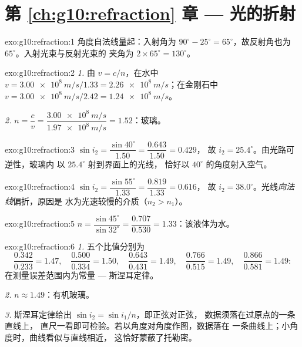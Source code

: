 \section*{第 \ref{ch:g10:refraction} 章 --- 光的折射}

\begin{solution}{exo:g10:refraction:1}
角度自法线量起：入射角为
$90^\circ - 25^\circ = 65^\circ$，故反射角也为
$65^\circ$。入射光束与反射光束的
夹角为 $2 \times 65^\circ = 130^\circ$。
\end{solution}

\begin{solution}{exo:g10:refraction:2}
\emph{1.} 由 $v = c/n$，在水中
$v = \qty{3.00e8}{m/s}/1.33 = \qty{2.26e8}{m/s}$；在金刚石中
$v = \qty{3.00e8}{m/s}/2.42 = \qty{1.24e8}{m/s}$。

\emph{2.} $n = \dfrac{c}{v} = \dfrac{\qty{3.00e8}{m/s}}
{\qty{1.97e8}{m/s}} = 1.52$：玻璃。
\end{solution}

\begin{solution}{exo:g10:refraction:3}
$\sin i_2 = \dfrac{\sin 40^\circ}{1.50} = \dfrac{0.643}{1.50} = 0.429$，
故 $i_2 = 25.4^\circ$。由光路可逆性，玻璃内
以 $25.4^\circ$ 射到界面上的光线，
恰好以 $40^\circ$ 的角度射入空气。
\end{solution}

\begin{solution}{exo:g10:refraction:4}
$\sin i_2 = \dfrac{\sin 55^\circ}{1.33} = \dfrac{0.819}{1.33} = 0.616$，
故 $i_2 = 38.0^\circ$。光线\emph{向法线}偏折，原因是
水为光速较慢的介质（$n_2 > n_1$）。
\end{solution}

\begin{solution}{exo:g10:refraction:5}
$n = \dfrac{\sin 45^\circ}{\sin 32^\circ} = \dfrac{0.707}{0.530}
= 1.33$：该液体为水。
\end{solution}

\begin{solution}{exo:g10:refraction:6}
\emph{1.} 五个比值分别为
\[
\frac{0.342}{0.233} = 1.47,\quad
\frac{0.500}{0.334} = 1.50,\quad
\frac{0.643}{0.431} = 1.49,\quad
\frac{0.766}{0.515} = 1.49,\quad
\frac{0.866}{0.581} = 1.49 :
\]
在测量误差范围内为常量 --- 斯涅耳定律。

\emph{2.} $n \approx 1.49$：有机玻璃。

\emph{3.} 斯涅耳定律给出 $\sin i_2 = \sin i_1 / n$，即正弦对正弦，
数据须落在过原点的一条直线上，
直尺一看即可检验。若以角度对角度作图，数据落在
一条曲线上；小角度时，曲线看似与直线相近，
这恰好蒙蔽了托勒密。
\end{solution}

